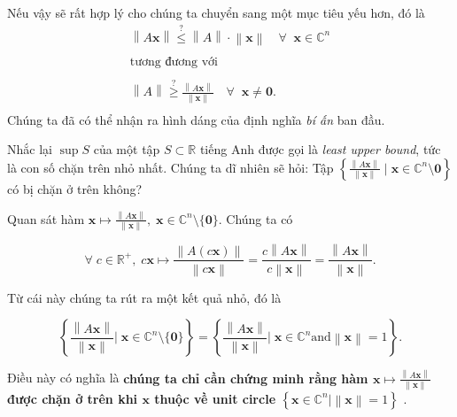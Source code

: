 \documentclass{article}
\newcommand{\norm}[1]{\left\lVert#1\right\rVert}
\begin{document}
Nếu vậy sẽ rất hợp lý cho chúng ta chuyển sang một mục tiêu yếu hơn, đó là
$$
  \begin{aligned}
    \norm{A\mathbf{x}} \stackrel{?}{\le} \norm{A}\cdot\norm{\mathbf{x}} \quad\forall\;\; \mathbf{x} \in \mathbb{C}^n \\
		\\
		\text{tương đương với} \\
		\\
		\norm{A} \stackrel{?}{\ge}  \frac{\norm{A\mathbf{x}}}{\norm{\mathbf{x}}}  \quad\forall\;\; \mathbf{x} \ne \mathbf{0}. \\
  \end{aligned}
$$
Chúng ta đã có thể nhận ra hình dáng của định nghĩa \textit{bí ấn} ban đầu.

Nhắc lại $\sup S$ của một tập $S \subset \mathbb{R}$ tiếng Anh được gọi là \textit{least upper bound}, tức là con số chặn trên nhỏ nhất.
Chúng ta dĩ nhiên sẽ hỏi:
Tập $\left\{\frac{\norm{A\mathbf{x}}}{\norm{\mathbf{x}}} \;|\; \mathbf{x} \in \mathbb{C}^n \setminus \mathbf{0}\right\}$ có bị chặn ở trên không?


Quan sát hàm $\mathbf{x} \mapsto \frac{\norm{A\mathbf{x}}}{\norm{\mathbf{x}}},\; \mathbf{x} \in \mathbb{C}^n \setminus \{\mathbf{0}\}.$ Chúng ta có

$$
	\forall\; c \in \mathbb{R}^{+},\;
	c\mathbf{x} \mapsto \frac{\norm{A(c\mathbf{x})}}{\norm{c\mathbf{x}}} = 
  \frac{c\norm{A\mathbf{x}}}{c\norm{\mathbf{x}}} =
  \frac{\norm{A\mathbf{x}}}{\norm{\mathbf{x}}}.
$$

Từ cái này chúng ta rút ra một kết quả nhỏ, đó là

$$
  \left\{ \frac{\norm{A\mathbf{x}}}{\norm{\mathbf{x}}} \vert\;
	\mathbf{x} \in \mathbb{C}^n \setminus \{\mathbf{0}\} \right\} =
  \left\{ \frac{\norm{A\mathbf{x}}}{\norm{\mathbf{x}}} \vert\;
	\mathbf{x} \in \mathbb{C}^n \text{and} \norm{\mathbf{x}} = 1 \right\}.
$$

Điều này có nghĩa là
\textbf{
	chúng ta chỉ cần chứng minh rằng hàm
  $\mathbf{x} \mapsto \frac{\norm{A\mathbf{x}}}{\norm{\mathbf{x}}}$
	được chặn ở trên khi $\mathbf{x}$ thuộc về unit circle
	$\left\{\mathbf{x} \in \mathbb{C}^n \vert \norm{\mathbf{x}} = 1\right\}$
}.
\end{document}
